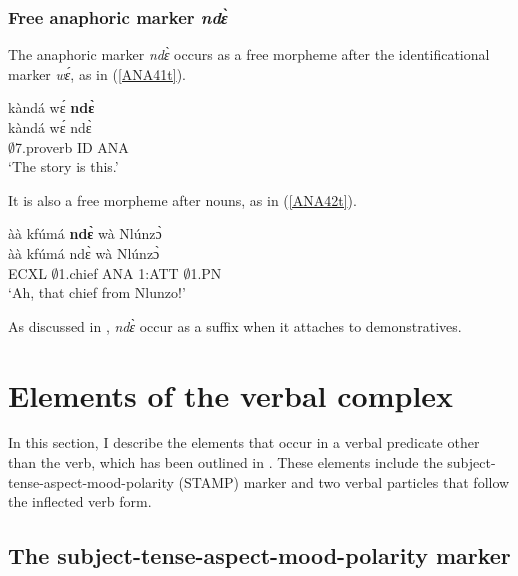 \subsubsection{Free anaphoric marker {\itshape ndɛ̀}}
\label{sec:ANAfree}

The anaphoric marker {\itshape ndɛ̀} occurs as a free morpheme after the identificational marker {\itshape wɛ́}, as in (\ref{ANA41t}).


\begin{exe} 
\ex\label{ANA41t}
  \glll kàndá wɛ́ {\bfseries ndɛ̀} \\
        kàndá wɛ́ ndɛ̀ \\
        $\emptyset$7.proverb ID ANA  \\
    \trans `The story is this.'
\end{exe}

\noindent It is also a free morpheme after nouns, as in (\ref{ANA42t}).

\begin{exe} 
\ex\label{ANA42t}  
  \glll  àà kfúmá {\bfseries ndɛ̀} wà Nlúnzɔ̀ \\
        àà kfúmá ndɛ̀ wà Nlúnzɔ̀ \\
        ECXL $\emptyset$1.chief ANA  1:ATT $\emptyset$1.PN  \\
    \trans `Ah, that chief from Nlunzo!'
\end{exe}

As discussed in , {\itshape ndɛ̀} occur as a suffix when it attaches to demonstratives.

















\section{Elements of the verbal complex}
\label{sec:VerbAd}

In this section, I describe the elements that occur in a verbal predicate other than the verb, which has been outlined in . These elements include the subject-tense-aspect-mood-polarity (STAMP) marker and two verbal particles that follow the inflected verb form.



\subsection[The subject-tense-aspect-mood-polarity marker]{The subject-tense-aspect-mood-polarity marker}
\label{sec:SCOP}

